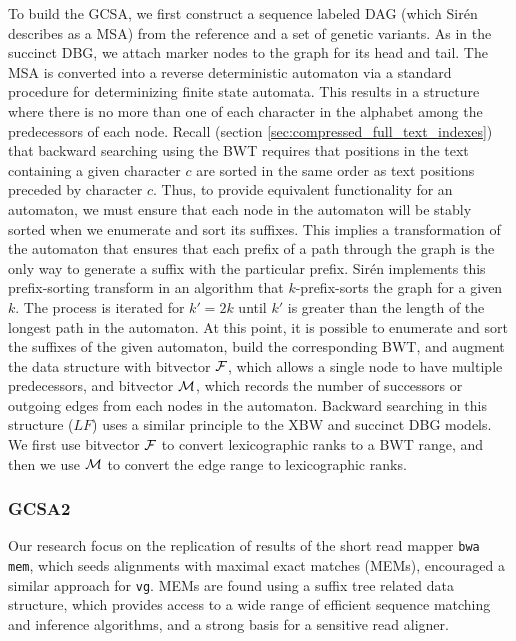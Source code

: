 To build the GCSA, we first construct a sequence labeled DAG (which Sir\'{e}n describes as a MSA) from the reference and a set of genetic variants.
As in the succinct DBG, we attach marker nodes to the graph for its head and tail.
The MSA is converted into a reverse deterministic automaton via a standard procedure for determinizing finite state automata.
This results in a structure where there is no more than one of each character in the alphabet among the predecessors of each node.
Recall (section \ref{sec:compressed_full_text_indexes}) that backward searching using the BWT requires that positions in the text containing a given character $c$ are sorted in the same order as text positions preceded by character $c$.
Thus, to provide equivalent functionality for an automaton, we must ensure that each node in the automaton will be stably sorted when we enumerate and sort its suffixes.
This implies a transformation of the automaton that ensures that each prefix of a path through the graph is the only way to generate a suffix with the particular prefix.
Sir\'{e}n implements this prefix-sorting transform in an algorithm that $k$-prefix-sorts the graph for a given $k$.
The process is iterated for $k' = 2k$ until $k'$ is greater than the length of the longest path in the automaton.
At this point, it is possible to enumerate and sort the suffixes of the given automaton, build the corresponding BWT, and augment the data structure with bitvector ${\cal F}$, which allows a single node to have multiple predecessors, and bitvector ${\cal M}$, which records the number of successors or outgoing edges from each nodes in the automaton.
Backward searching in this structure ($LF$) uses a similar principle to the XBW and succinct DBG models.
We first use bitvector ${\cal F}$ to convert lexicographic ranks to a BWT range, and then we use ${\cal M}$ to convert the edge range to lexicographic ranks.

\subsubsection{GCSA2}



Our research focus on the replication of results of the short read mapper {\tt bwa mem}, which seeds alignments with maximal exact matches (MEMs), encouraged a similar approach for {\tt vg}.
MEMs are found using a suffix tree related data structure, which provides access to a wide range of efficient sequence matching and inference algorithms, and a strong basis for a sensitive read aligner.

